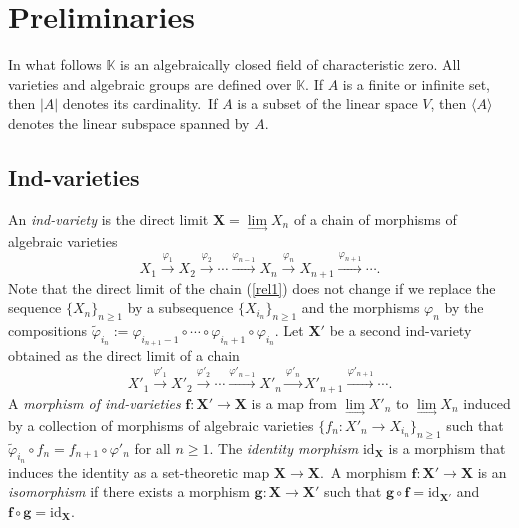 \documentclass[12pt]{amsart}
\theoremstyle{definition}
\begin{document}
\section{Preliminaries}

In what follows $\mathbb{K}$ is an algebraically closed field of characteristic zero.
All varieties and algebraic groups are defined over $\mathbb{K}$. If $A$ is a finite or infinite set, then $|A|$ denotes its cardinality.\ If $A$ is a subset of the linear space $V$, then $\langle A\rangle$ denotes the linear subspace spanned by $A$.

\subsection{Ind-varieties}

\label{section-2-1}

An {\em ind-variety} is the direct limit $\mathbf{X}=\lim\limits_\to X_n$ of a chain of morphisms of algebraic varieties
\begin{equation}
\label{rel1}
X_1\stackrel{\varphi_1}{\to} X_2\stackrel{\varphi_2}{\to}\cdots\stackrel{\varphi_{n-1}}{\to}
X_n\stackrel{\varphi_n}{\to} X_{n+1}\stackrel{\varphi_{n+1}}{\to}\cdots.
\end{equation}
Note that the direct limit of the chain (\ref{rel1}) does not change if we replace the sequence $\{X_n\}_{n\geq 1}$ by a subsequence $\{X_{i_n}\}_{n\geq 1}$ and the morphisms $\varphi_n$ by the compositions $\tilde\varphi_{i_n}:=\varphi_{i_{n+1}-1}\circ\cdots\circ\varphi_{i_n+1}\circ\varphi_{i_n}$. Let $\mathbf{X}'$ be a second ind-variety obtained as the direct limit of a chain
\[
X'_1\stackrel{\varphi'_1}{\to} X'_2\stackrel{\varphi'_2}{\to}\cdots\stackrel{\varphi'_{n-1}}{\to}
X'_n\stackrel{\varphi'_n}{\to} X'_{n+1}\stackrel{\varphi'_{n+1}}{\to}\cdots.
\]
A {\em morphism of ind-varieties} $\mathbf{f}:\mathbf{X}'\to\mathbf{X}$ is a map from $\lim\limits_\to X'_n$ to $\lim\limits_\to X_n$ induced by a collection of morphisms of algebraic varieties $\{f_n:X'_n\to X_{i_n}\}_{n\geq 1}$ such that $\tilde\varphi_{i_n}\circ f_n=f_{n+1}\circ\varphi'_{n}$ for all $n\geq 1$. The {\em identity morphism} $\mathrm{id}_\mathbf{X}$ is a morphism that induces the identity as a set-theoretic map  $\mathbf{X}\to\mathbf{X}$.\ A morphism $\mathbf{f}:\mathbf{X}'\to\mathbf{X}$ is an {\em isomorphism} if there exists a morphism $\mathbf{g}:\mathbf{X}\to\mathbf{X}'$ such that $\mathbf{g}\circ\mathbf{f}=\mathrm{id}_{\mathbf{X}'}$ and $\mathbf{f}\circ\mathbf{g}=\mathrm{id}_{\mathbf{X}}$.
\end{document}
